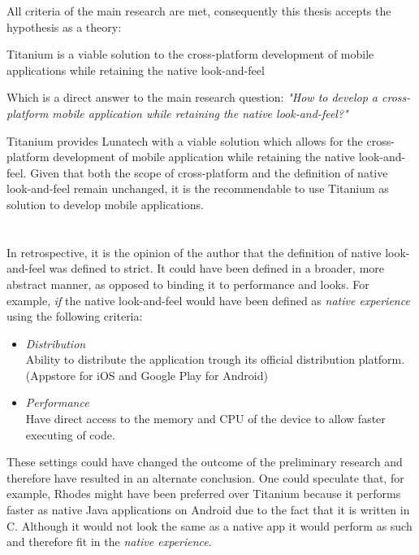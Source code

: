 \noindent All criteria of the main research are met, consequently this thesis accepts the hypothesis as a theory:

\begin{shadequote}
Titanium is a viable solution to the cross-platform development of mobile applications while retaining the native look-and-feel%
\end{shadequote}

\noindent Which is a direct answer to the main research question: \emph{"How to develop a cross-platform mobile application while retaining the native look-and-feel?"}

%
%
Titanium provides Lunatech with a viable solution which allows for the cross-platform development of mobile application while retaining the native look-and-feel. Given that both the scope of cross-platform and the definition of native look-and-feel remain unchanged, it is the recommendable to use Titanium as solution to develop mobile applications.
\\~\\~\\
In retrospective, it is the opinion of the author that the definition of native look-and-feel was defined to strict. It could have been defined in a broader, more abstract manner, as opposed to binding it to performance and looks. For example, \emph{if} the native look-and-feel would have been defined as \emph{native experience} using the following criteria:
\begin{itemize}
\item \emph{Distribution}\\
Ability to distribute the application trough its official distribution platform. (Appstore for iOS and Google Play for Android)
\item \emph{Performance}\\
Have direct access to the memory and CPU of the device to allow faster executing of code.
\end{itemize}
\noindent These settings could have changed the outcome of the preliminary research and therefore have resulted in an alternate conclusion. One could speculate that, for example, Rhodes might have been preferred over Titanium because it performs faster as native Java applications on Android due to the fact that it is written in C.\cite{Rhodes2012} Although it would not look the same as a native app it would perform as such and therefore fit in the \emph{native experience}.


